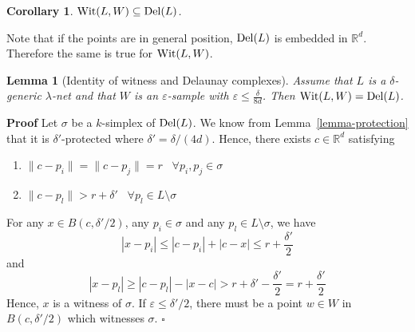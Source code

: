 \documentclass[11pt,a4paper]{article}
\newtheorem{lemma}{Lemma}
\newtheorem{corol}{Corollary}
\newenvironment{proof}
        {\noindent \textbf{Proof} \hspace{0.3mm}}
        {\hspace{0.3mm}$\square$  \smallskip}
\newcommand{\e}{\varepsilon}
\newcommand{\R}{\mathbb R}
\newcommand{\del}{{\rm Del}}
\newcommand{\wit}{{\rm Wit}}
\begin{document}
\begin{corol}
 $\wit
(L,W) \subseteq \del (L)$.
\label{lemma-wit-in-del}
\end{corol}


Note that if the points are in general position, $\del(L)$ is embedded in
$\R^d$. Therefore the same is true for  $\wit (L,W )$.













\begin{lemma}[Identity of witness and Delaunay complexes]
Assume that $L$ is a $\delta$-generic $\lambda$-net and
that $W$ is an $\e$-sample with $\e\leq \frac{\delta}{8d}$. Then $\wit (L,W)= \del(L)$.
\label{lemma-wit=del}
\end{lemma}

\begin{proof}
  Let $\sigma$ be a $k$-simplex of $\del (L)$. We know from
  Lemma~\ref{lemma-protection} that it is $\delta '$-protected where
  $\delta'= \delta/(4d)$. Hence,
there exists $c\in \R^d$ satisfying
\begin{enumerate}
\item  $\| c-p_i\| = \| c-p_j\| = r\;\;\; \forall p_i,p_j\in \sigma$
\item $\| c-p_l\| > r+\delta' \;\;\; \forall p_l\in L\setminus \sigma $
\end{enumerate}

For any $x\in B(c, \delta'/2 )$, 
any $p_i\in \sigma$  and any $p_l \in L\setminus\sigma$, we have
\[ |x-p_i| \leq |c-p_i| + | c-x| \leq r + \frac{\delta'}{2} \]
and
\[ |x-p_l| \geq |c-p_l| -|x-c| > r+\delta' -\frac{\delta'}{2}= r + \frac{\delta'}{2} \]
Hence, $x$ is a witness of $\sigma$. If $\e \leq
\delta'/2$, there must be a point  $w \in W$ in $B(c, \delta'/2 )$ which
witnesses $\sigma$.
\end{proof}
\end{document}
